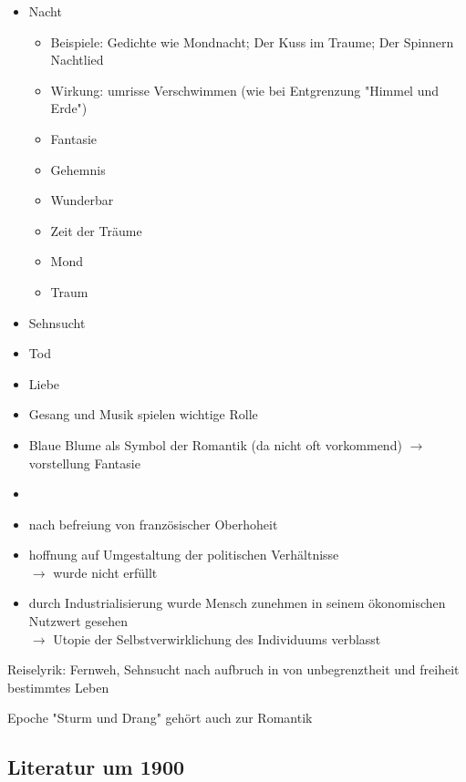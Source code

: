 \begin{itemize}
    \item Nacht 
        \begin{itemize}
            \item Beispiele: Gedichte wie Mondnacht; Der Kuss im Traume; Der Spinnern Nachtlied
            \item Wirkung: umrisse Verschwimmen (wie bei Entgrenzung "Himmel und Erde")
            \item Fantasie
            \item Gehemnis
            \item Wunderbar
            \item Zeit der Träume
            \item Mond
            \item Traum
        \end{itemize}
    \item Sehnsucht
    \item Tod
    \item Liebe
    \item Gesang und Musik spielen wichtige Rolle
    \item Blaue Blume als Symbol der Romantik (da nicht oft vorkommend) $\rightarrow$ vorstellung Fantasie
    \item 
\end{itemize}

\begin{itemize}
    \item nach befreiung von französischer Oberhoheit
    \item hoffnung auf Umgestaltung der politischen Verhältnisse \\
        $\rightarrow$ wurde nicht erfüllt
    \item durch Industrialisierung wurde Mensch zunehmen in seinem ökonomischen Nutzwert gesehen \\
        $\rightarrow$ Utopie der Selbstverwirklichung des Individuums verblasst
\end{itemize}

Reiselyrik: Fernweh, Sehnsucht nach aufbruch in von unbegrenztheit und freiheit bestimmtes Leben

Epoche "Sturm und Drang" gehört auch zur Romantik


\subsection{Literatur um 1900}

